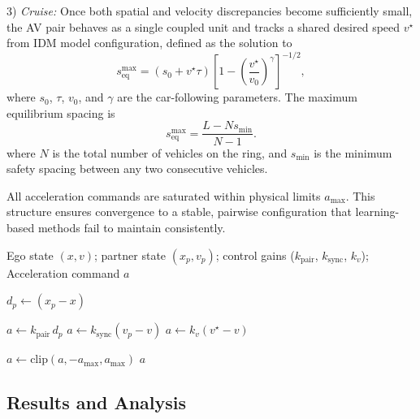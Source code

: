 \documentclass{ifacconf}
\newcommand{\1}{\mbox{1}\hspace{-0.25em}\mbox{l}}
\begin{document}
3) \emph{Cruise:} Once both spatial and velocity discrepancies become sufficiently small, the AV pair behaves as a single coupled unit and tracks a shared desired speed \(v^\star\) from IDM model configuration, defined as the solution to
\begin{equation}
s_{\mathrm{eq}}^{\max} 
= \left( s_0 + v^\star \tau \right)
\left[ 1 - \left( \frac{v^\star}{v_0} \right)^{\gamma} \right]^{-1/2},
\end{equation}
where \(s_0\), \(\tau\), \(v_0\), and \(\gamma\) are the car-following parameters.
The maximum equilibrium spacing is
\begin{equation}
s_{\mathrm{eq}}^{\max}
= \frac{L - N s_{\min}}{N - 1}.
\end{equation}
where $N$ is the total number of vehicles on the ring, and $s_{\min}$ is the minimum safety spacing between any two consecutive vehicles. 

All acceleration commands are saturated within physical limits $a_{\max}$. This structure ensures convergence to a stable,
pairwise configuration that learning-based methods fail to maintain consistently.
\begin{algorithm}[t!]\label{Alg:PairRule}
\caption{Pair-Aligned Control Strategy}
\label{alg:pair}
\begin{algorithmic}[1]
\Require Ego state $(x, v)$; partner state $(x_p, v_p)$; control gains ($k_{\mathrm{pair}}$, $ k_{\mathrm{sync}}$, $k_v$);
\Ensure Acceleration command $a$

\State $d_p \gets (x_p - x)$ 

    \State $a \gets k_{\mathrm{pair}}\, d_p$  
    \State $a \gets k_{\mathrm{sync}} (v_p - v)$ 
\Else
    \State $a \gets k_v (v^\star - v)$ 
\EndIf

\State $a \gets \mathrm{clip}(a, -a_{\max}, a_{\max})$
\State \Return $a$

\end{algorithmic}
\end{algorithm}
 

\subsection{Results and Analysis}
\end{document}
